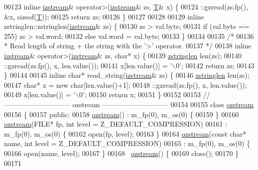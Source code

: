 \begin{DoxyCode}
00123 \textcolor{keyword}{inline} \hyperlink{classizstream}{izstream}& operator>(\hyperlink{classizstream}{izstream}& zs, \hyperlink{group___sparse_core___module_class_eigen_1_1_triplet}{T}& x) \{
00124     ::gzread(zs.fp(), &x, \textcolor{keyword}{sizeof}(\hyperlink{group___sparse_core___module_class_eigen_1_1_triplet}{T}));
00125     \textcolor{keywordflow}{return} zs;
00126 \}
00127 
00128 
00129 \textcolor{keyword}{inline} zstringlen::zstringlen(\hyperlink{classizstream}{izstream}& zs) \{
00130     zs > val.byte;
00131     \textcolor{keywordflow}{if} (val.byte == 255) zs > val.word;
00132     \textcolor{keywordflow}{else} val.word = val.byte;
00133 \}
00134 
00135 \textcolor{comment}{/*}
00136 \textcolor{comment}{ * Read length of string + the string with the '>' operator.}
00137 \textcolor{comment}{ */}
00138 \textcolor{keyword}{inline} \hyperlink{classizstream}{izstream}& operator>(\hyperlink{classizstream}{izstream}& zs, \textcolor{keywordtype}{char}* x) \{
00139     \hyperlink{classzstringlen}{zstringlen} len(zs);
00140     ::gzread(zs.fp(), x, len.value());
00141     x[len.value()] = \textcolor{charliteral}{'\(\backslash\)0'};
00142     \textcolor{keywordflow}{return} zs;
00143 \}
00144 
00145 \textcolor{keyword}{inline} \textcolor{keywordtype}{char}* read\_string(\hyperlink{classizstream}{izstream}& zs) \{
00146     \hyperlink{classzstringlen}{zstringlen} len(zs);
00147     \textcolor{keywordtype}{char}* x = \textcolor{keyword}{new} \textcolor{keywordtype}{char}[len.value()+1];
00148     ::gzread(zs.fp(), x, len.value());
00149     x[len.value()] = \textcolor{charliteral}{'\(\backslash\)0'};
00150     \textcolor{keywordflow}{return} x;
00151 \}
00152 
00153 \textcolor{comment}{// ----------------------------- ozstream -----------------------------}
00154 
00155 \textcolor{keyword}{class }\hyperlink{classozstream}{ozstream}
00156 \{
00157     \textcolor{keyword}{public}:
00158         \hyperlink{classozstream}{ozstream}() : m\_fp(0), m\_os(0) \{
00159         \}
00160         \hyperlink{classozstream}{ozstream}(FILE* fp, \textcolor{keywordtype}{int} level = Z\_DEFAULT\_COMPRESSION)
00161             : m\_fp(0), m\_os(0) \{
00162             open(fp, level);
00163         \}
00164         \hyperlink{classozstream}{ozstream}(\textcolor{keyword}{const} \textcolor{keywordtype}{char}* name, \textcolor{keywordtype}{int} level = Z\_DEFAULT\_COMPRESSION)
00165             : m\_fp(0), m\_os(0) \{
00166             open(name, level);
00167         \}
00168         ~\hyperlink{classozstream}{ozstream}() \{
00169             close();
00170         \}
00171 

\end{DoxyCode}
